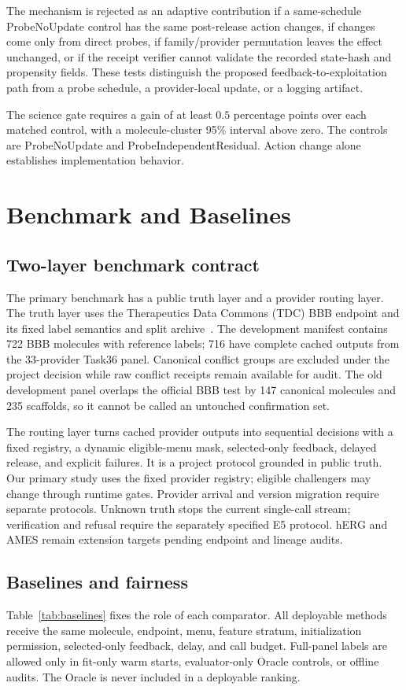 \documentclass[sigconf,anonymous]{aamas}
\begin{document}
The mechanism is rejected as an adaptive contribution if a same-schedule ProbeNoUpdate control has the same post-release action changes, if changes come only from direct probes, if family/provider permutation leaves the effect unchanged, or if the receipt verifier cannot validate the recorded state-hash and propensity fields. These tests distinguish the proposed feedback-to-exploitation path from a probe schedule, a provider-local update, or a logging artifact.

The science gate requires a gain of at least $0.5$ percentage points over each matched control, with a molecule-cluster 95\% interval above zero. The controls are ProbeNoUpdate and ProbeIndependentResidual. Action change alone establishes implementation behavior.

\section{Benchmark and Baselines}
\subsection{Two-layer benchmark contract}
The primary benchmark has a public truth layer and a provider routing layer. The truth layer uses the Therapeutics Data Commons (TDC) BBB endpoint and its fixed label semantics and split archive~\cite{huang2021tdc}. The development manifest contains 722 BBB molecules with reference labels; 716 have complete cached outputs from the 33-provider Task36 panel. Canonical conflict groups are excluded under the project decision while raw conflict receipts remain available for audit. The old development panel overlaps the official BBB test by 147 canonical molecules and 235 scaffolds, so it cannot be called an untouched confirmation set.

The routing layer turns cached provider outputs into sequential decisions with a fixed registry, a dynamic eligible-menu mask, selected-only feedback, delayed release, and explicit failures. It is a project protocol grounded in public truth. Our primary study uses the fixed provider registry; eligible challengers may change through runtime gates. Provider arrival and version migration require separate protocols. Unknown truth stops the current single-call stream; verification and refusal require the separately specified E5 protocol. hERG and AMES remain extension targets pending endpoint and lineage audits.

\subsection{Baselines and fairness}
Table~\ref{tab:baselines} fixes the role of each comparator. All deployable methods receive the same molecule, endpoint, menu, feature stratum, initialization permission, selected-only feedback, delay, and call budget. Full-panel labels are allowed only in fit-only warm starts, evaluator-only Oracle controls, or offline audits. The Oracle is never included in a deployable ranking.
\end{document}
